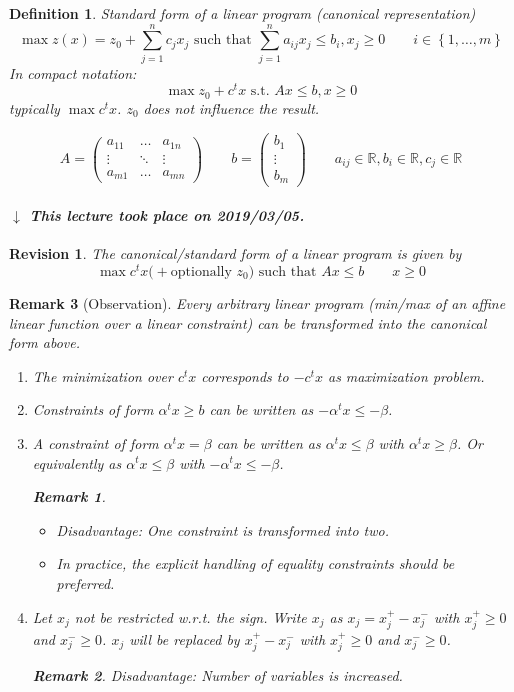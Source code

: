 \documentclass[a4paper]{article}
\numberwithin{lecref}{section}
\newtheorem*{Definition}{Definition}
\newtheorem*{Remark}{Remark}
\newtheorem*{Revision}{Revision}
\newcommand{\Set}[1]{\left\{#1\right\}}
\newcommand{\dateref}[1]{%
  \begin{mdframed}[backgroundcolor=gray!10,innerbottommargin=0pt,innertopmargin=0pt]
    \paragraph{\textit{$\downarrow$ This lecture took place on #1.}}%
  \end{mdframed}%
}
\begin{document}
\begin{Definition}
  Standard form of a linear program (canonical representation)
  \[ \max{z(x)} = z_0 + \sum_{j=1}^n c_j x_j \text{ such that } \sum_{j=1}^n a_{ij} x_j \leq b_i, x_j \geq 0 \qquad i \in \Set{1, \dots, m} \]
  In compact notation:
  \[ \max{z_0 + c^t x} \text{ s.t. } Ax \leq b, x \geq 0 \]
  typically $\max c^t x$.
  $z_0$ does not influence the result.

  \[ A = \begin{pmatrix} a_{11} & \dots & a_{1n} \\ \vdots & \ddots & \vdots \\ a_{m1} & \dots & a_{mn} \end{pmatrix} \qquad b = \begin{pmatrix} b_1 \\ \vdots \\ b_m \end{pmatrix} \qquad a_{ij} \in \mathbb R, b_i \in \mathbb R, c_j \in \mathbb R \]
\end{Definition}

\dateref{2019/03/05}

\begin{Revision}
	The canonical/standard form of a linear program is given by
	\[ \max c^t x \text{(} + \text{optionally } z_0 \text{) such that } Ax \leq b \qquad x \geq 0 \]
\end{Revision}

\begin{Remark}[Observation]
  Every arbitrary linear program (min/max of an affine linear function over a linear constraint) can be transformed into the canonical form above.
  \begin{enumerate}
  	\item The minimization over $c^t x$ corresponds to $-c^t x$ as maximization problem.
  	\item Constraints of form $\alpha^t x \geq b$ can be written as $-\alpha^t x \leq -\beta$.
  	\item A constraint of form $\alpha^t x = \beta$ can be written as $\alpha^t x \leq \beta$ with $\alpha^t x \geq \beta$. Or equivalently as $\alpha^t x \leq \beta$ with $-\alpha^t x \leq -\beta$.
  		\begin{Remark} \hfill
	  		\begin{itemize}
	  			\item Disadvantage: One constraint is transformed into two.
	  			\item In practice, the explicit handling of equality constraints should be preferred.
	  		\end{itemize}
  		\end{Remark}
  	\item Let $x_j$ not be restricted w.r.t. the sign. Write $x_j$ as $x_j = x_j^+ - x_j^-$ with $x_j^+ \geq 0$ and $x_j^- \geq 0$.
  		$x_j$ will be replaced by $x_j^+ - x_j^-$ with $x_j^+ \geq 0$ and $x_j^- \geq 0$.
  		\begin{Remark}
  			Disadvantage: Number of variables is increased.
  		\end{Remark}
  \end{enumerate}
\end{Remark}
\end{document}

